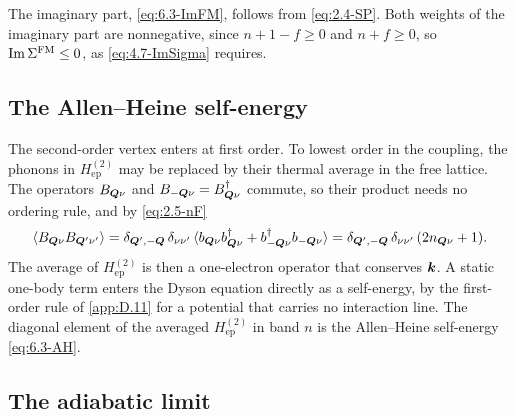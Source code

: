The imaginary part, \cref{eq:6.3-ImFM}, follows from \cref{eq:2.4-SP}. Both weights of the imaginary part are nonnegative, since $n + 1 - f \ge 0$ and $n + f \ge 0$, so $\operatorname{Im}\Sigma^{\mathrm{FM}} \le 0$, as \cref{eq:4.7-ImSigma} requires.

\subsection*{The Allen--Heine self-energy}

The second-order vertex enters at first order. To lowest order in the coupling, the phonons in $H^{(2)}_{\mathrm{ep}}$ may be replaced by their thermal average in the free lattice. The operators $B_{\bm{Q}\nu}$ and $B_{-\bm{Q}\nu} = B^\dagger_{\bm{Q}\nu}$ commute, so their product needs no ordering rule, and by \cref{eq:2.5-nF}
\begin{equation*}
  \langle B_{\bm{Q}\nu}B_{\bm{Q}'\nu'}\rangle = \delta_{\bm{Q}',-\bm{Q}}\,\delta_{\nu\nu'}\,\langle b_{\bm{Q}\nu}b^\dagger_{\bm{Q}\nu} + b^\dagger_{-\bm{Q}\nu}b_{-\bm{Q}\nu}\rangle = \delta_{\bm{Q}',-\bm{Q}}\,\delta_{\nu\nu'}\,(2n_{\bm{Q}\nu} + 1) .
\end{equation*}
The average of $H^{(2)}_{\mathrm{ep}}$ is then a one-electron operator that conserves $\bm{k}$. A static one-body term enters the Dyson equation directly as a self-energy, by the first-order rule of \cref{app:D.11} for a potential that carries no interaction line. The diagonal element of the averaged $H^{(2)}_{\mathrm{ep}}$ in band $n$ is the Allen--Heine self-energy \cref{eq:6.3-AH}.

\subsection*{The adiabatic limit}

